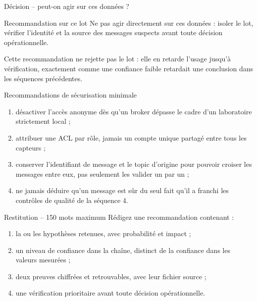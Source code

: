 \documentclass[aspectratio=169]{beamer}
\begin{document}
\begin{frame}{Décision -- peut-on agir sur ces données ?}
  \begin{block}{Recommandation sur ce lot}
    Ne pas agir directement sur ces données : isoler le lot, vérifier l'identité et la source des messages suspects avant toute décision opérationnelle.
  \end{block}
  \normalsize Cette recommandation ne rejette pas le lot : elle en retarde l'usage jusqu'à vérification, exactement comme une confiance faible retardait une conclusion dans les séquences précédentes.
\end{frame}

\begin{frame}{Recommandations de sécurisation minimale}
  \begin{enumerate}
    \item désactiver l'accès anonyme dès qu'un broker dépasse le cadre d'un laboratoire strictement local ;
    \item attribuer une ACL par rôle, jamais un compte unique partagé entre tous les capteurs ;
    \item conserver l'identifiant de message et le topic d'origine pour pouvoir croiser les messages entre eux, pas seulement les valider un par un ;
    \item ne jamais déduire qu'un message est sûr du seul fait qu'il a franchi les contrôles de qualité de la séquence 4.
  \end{enumerate}
\end{frame}

\begin{frame}{Restitution -- 150 mots maximum}
  Rédigez une recommandation contenant :
  \begin{enumerate}
    \item la ou les hypothèses retenues, avec probabilité et impact ;
    \item un niveau de confiance dans la chaîne, distinct de la confiance dans les valeurs mesurées ;
    \item deux preuves chiffrées et retrouvables, avec leur fichier source ;
    \item une vérification prioritaire avant toute décision opérationnelle.
  \end{enumerate}
\end{frame}
\end{document}
